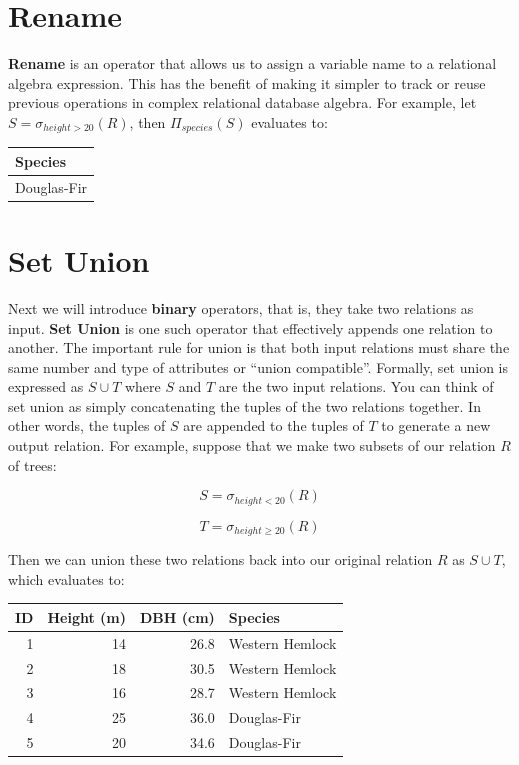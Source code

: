 \documentclass[
]{book}
\begin{document}
\section{Rename}\label{rename}

\textbf{Rename} is an operator that allows us to assign a variable name to a relational algebra expression. This has the benefit of making it simpler to track or reuse previous operations in complex relational database algebra. For example, let \(S = σ_{height>20}(R)\), then \(Π_{species}(S)\) evaluates to:

\begin{tabular}{l}
\toprule
Species\\
\midrule
Douglas-Fir\\
\bottomrule
\end{tabular}

\section{Set Union}\label{set-union}

Next we will introduce \textbf{binary} operators, that is, they take two relations as input. \textbf{Set Union} is one such operator that effectively appends one relation to another. The important rule for union is that both input relations must share the same number and type of attributes or ``union compatible''. Formally, set union is expressed as \(S∪T\) where \(S\) and \(T\) are the two input relations. You can think of set union as simply concatenating the tuples of the two relations together. In other words, the tuples of \(S\) are appended to the tuples of \(T\) to generate a new output relation. For example, suppose that we make two subsets of our relation \(R\) of trees:

\[
S = σ_{height<20}(R)
\]

\[
T = σ_{height≥20}(R)
\]

Then we can union these two relations back into our original relation \(R\) as \(S∪T\), which evaluates to:

\begin{tabular}{rrrl}
\toprule
ID & Height (m) & DBH (cm) & Species\\
\midrule
1 & 14 & 26.8 & Western Hemlock\\
2 & 18 & 30.5 & Western Hemlock\\
3 & 16 & 28.7 & Western Hemlock\\
4 & 25 & 36.0 & Douglas-Fir\\
5 & 20 & 34.6 & Douglas-Fir\\
\bottomrule
\end{tabular}
\end{document}
